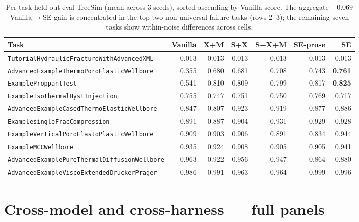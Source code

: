 \documentclass{article}
\begin{document}
\begin{table}[h]
  \caption{Per-task held-out-eval TreeSim (mean across 3 seeds), sorted ascending by Vanilla score. The aggregate $+0.069$ Vanilla$\to$SE gain is concentrated in the top two non-universal-failure tasks (rows 2--3); the remaining seven tasks show within-noise differences across cells.}
  \label{tab:per-task-icl10}
  \centering
  \footnotesize
  \begin{tabular}{lrrrrrr}
    \toprule
    \textbf{Task} & \textbf{Vanilla} & \textbf{X+M} & \textbf{S+X} & \textbf{S+X+M} & \textbf{SE-prose} & \textbf{SE} \\
    \midrule
    \texttt{TutorialHydraulicFractureWithAdvancedXML}      & 0.013 & 0.013 & 0.013 & 0.013 & 0.013 & 0.013 \\
    \texttt{AdvancedExampleThermoPoroElasticWellbore}      & 0.355 & 0.680 & 0.681 & 0.708 & 0.743 & \textbf{0.761} \\
    \texttt{ExampleProppantTest}                           & 0.541 & 0.810 & 0.809 & 0.799 & 0.817 & \textbf{0.825} \\
    \texttt{ExampleIsothermalHystInjection}                & 0.755 & 0.747 & 0.751 & 0.750 & 0.769 & 0.717 \\
    \texttt{AdvancedExampleCasedThermoElasticWellbore}     & 0.847 & 0.807 & 0.923 & 0.919 & 0.877 & 0.886 \\
    \texttt{ExamplesingleFracCompression}                  & 0.891 & 0.887 & 0.904 & 0.931 & 0.929 & 0.928 \\
    \texttt{ExampleVerticalPoroElastoPlasticWellbore}      & 0.909 & 0.903 & 0.906 & 0.891 & 0.834 & 0.944 \\
    \texttt{ExampleMCCWellbore}                            & 0.935 & 0.924 & 0.908 & 0.905 & 0.905 & 0.941 \\
    \texttt{AdvancedExamplePureThermalDiffusionWellbore}   & 0.963 & 0.922 & 0.956 & 0.947 & 0.864 & 0.880 \\
    \texttt{AdvancedExampleViscoExtendedDruckerPrager}     & 0.986 & 0.991 & 0.963 & 0.964 & 0.999 & 0.996 \\
    \bottomrule
  \end{tabular}
\end{table}

\section{Cross-model and cross-harness — full panels}
\label{app:cross-model-detail}
\label{app:cross-model}
\end{document}
